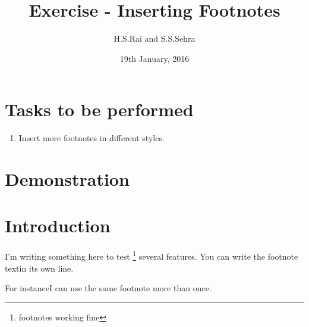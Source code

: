 \documentclass{article}
\title{Exercise - Inserting Footnotes}
\author{H.S.Rai and S.S.Sehra}
\date{19th January, 2016}
\begin{document}
	\maketitle	
	\section*{Tasks to be performed}
	\begin{enumerate}	
		\item Insert more footnotes in different styles.
	\end{enumerate}
	\section*{Demonstration}

\section{Introduction}
I'm writing something here to test \footnote{footnotes working fine} several features. You can write the footnote text\footnotemark in its own line.


For instance\footnotemark I can use the same footnote more than once\footnotemark[\value{footnote}].


\end{document}
